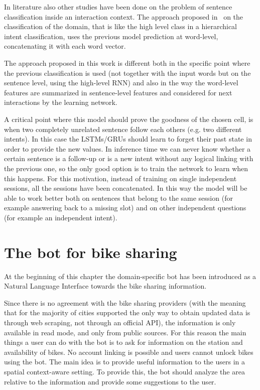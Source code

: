 In literature also other studies have been done on the problem of sentence classification inside an interaction context. The approach proposed in~\cite{xu2014contextual} on the classification of the domain, that is like the high level class in a hierarchical intent classification, uses the previous model prediction at word-level, concatenating it with each word vector.

The approach proposed in this work is different both in the specific point where the previous classification is used (not together with the input words but on the sentence level, using the high-level RNN) and also in the way the word-level features are summarized in sentence-level features and considered for next interactions by the learning network.

A critical point where this model should prove the goodness of the chosen cell, is when two completely unrelated sentence follow each others (e.g. two different intents). In this case the LSTMs/GRUs should learn to forget their past state in order to provide the new values. In inference time we can never know whether a certain sentence is a follow-up or is a new intent without any logical linking with the previous one, so the only good option is to train the network to learn when this happens. For this motivation, instead of training on single independent sessions, all the sessions have been concatenated. In this way the model will be able to work better both on sentences that belong to the same session (for example answering back to a missing slot) and on other independent questions (for example an independent intent).

\section{The bot for bike sharing}
\label{approachPrototype}

At the beginning of this chapter the domain-specific bot has been introduced as a Natural Language Interface towards the bike sharing information.

Since there is no agreement with the bike sharing providers (with the meaning that for the majority of cities supported the only way to obtain updated data is through web scraping, not through an official API), the information is only available in read mode, and only from public sources. For this reason the main things a user can do with the bot is to ask for information on the station and availability of bikes. No account linking is possible and users cannot unlock bikes using the bot. The main idea is to provide useful information to the users in a spatial context-aware setting. To provide this, the bot should analyze the area relative to the information and provide some suggestions to the user.

